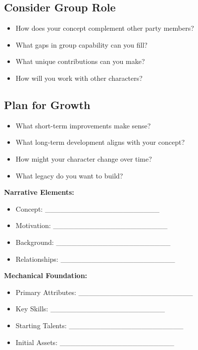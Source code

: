 \begin{multicols}{2}
\subsection*{Consider Group Role}
\begin{itemize}
\item How does your concept complement other party members?
\item What gaps in group capability can you fill?
\item What unique contributions can you make?
\item How will you work with other characters?
\end{itemize}

\subsection*{Plan for Growth}
\begin{itemize}
\item What short-term improvements make sense?
\item What long-term development aligns with your concept?
\item How might your character change over time?
\item What legacy do you want to build?
\end{itemize}

\begin{tcolorbox}[colback=green!5!white,colframe=green!75!black,title=Character Concept Worksheet,fonttitle=\bfseries]
\textbf{Narrative Elements:}
\begin{itemize}
\item Concept: \_\_\_\_\_\_\_\_\_\_\_\_\_\_\_\_\_\_\_\_\_\_
\item Motivation: \_\_\_\_\_\_\_\_\_\_\_\_\_\_\_\_\_\_\_\_\_\_
\item Background: \_\_\_\_\_\_\_\_\_\_\_\_\_\_\_\_\_\_\_\_\_\_
\item Relationships: \_\_\_\_\_\_\_\_\_\_\_\_\_\_\_\_\_\_\_\_\_\_
\end{itemize}

\textbf{Mechanical Foundation:}
\begin{itemize}
\item Primary Attributes: \_\_\_\_\_\_\_\_\_\_\_\_\_\_\_\_\_\_\_\_\_\_
\item Key Skills: \_\_\_\_\_\_\_\_\_\_\_\_\_\_\_\_\_\_\_\_\_\_
\item Starting Talents: \_\_\_\_\_\_\_\_\_\_\_\_\_\_\_\_\_\_\_\_\_\_
\item Initial Assets: \_\_\_\_\_\_\_\_\_\_\_\_\_\_\_\_\_\_\_\_\_\_
\end{itemize}


\end{tcolorbox}
\end{multicols}
